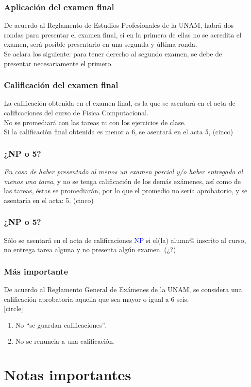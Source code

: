 \documentclass[12pt]{beamer}
\newcommand{\textoazul}[1]{\textcolor{blue}{#1}}
\begin{document}
\begin{frame}
\frametitle{Aplicación del examen final}
De acuerdo al Reglamento de Estudios Profesionales de la UNAM, habrá dos rondas para presentar el examen final, si en la primera de ellas no se acredita el examen, será posible presentarlo en una segunda y última ronda.
\\
\bigskip
\pause
Se aclara los siguiente: \alert{para tener derecho al segundo examen, se debe de presentar necesariamente el primero.}
\end{frame}
\begin{frame}
\frametitle{Calificación del examen final}
La calificación obtenida en el examen final, es la que se asentará en el acta de calificaciones del curso de Física Computacional.
\\
\bigskip
No se promediará con las tareas ni con los ejercicios de clase.
\\
\bigskip
Si la calificación final obtenida es menor a 6, se asentará en el acta \alert{5, (cinco)}
\end{frame}
\begin{frame}
\frametitle{\textbf{¿NP o 5?}}
\emph{En caso de haber presentado al menos un examen parcial y/o haber entregado al menos una tarea}, y no se tenga calificación de los demás exámenes, así como de las tareas, éstas se promediarán, por lo que el promedio no sería aprobatorio, y se asentaría en el acta: \alert{5, (cinco)}
\end{frame}
\begin{frame}
\frametitle{\textbf{¿NP o 5?}}
Sólo se asentará en el acta de calificaciones \textoazul{NP} si el(la) alumn{@} inscrito al curso, no entrega tarea alguna y no presenta algún examen. (¿?)
\end{frame}
\begin{frame}
\frametitle{Más importante}
De acuerdo al Reglamento General de Exámenes de la UNAM, se considera una calificación aprobatoria aquella que sea mayor o igual a $6$ seis.
\\
\medskip
{}
[circle]
\begin{enumerate}[<+->]
\item No \enquote{se guardan calificaciones}.
\item No se renuncia a una calificación.
\end{enumerate}
\end{frame}
\section{Notas importantes}
\end{document}
